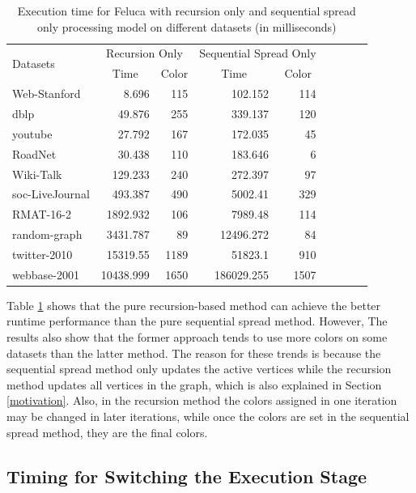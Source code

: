 \begin{table}[h]
	\centering
	\caption{Execution time for Feluca with recursion only and sequential spread only 
		processing model on different datasets (in milliseconds)}
	\label{tab:exectime}
	\begin{tabular}{|l|r|r|r|r|r|r|r|r|}
		\hline
		\multirow{2}{*}{Datasets} &\multicolumn{2}{|c|}{Recursion Only}	&\multicolumn{2}{c|}{Sequential Spread Only}\\ \cline{2-5} 
		&\multicolumn{1}{|c|}{Time}		&\multicolumn{1}{|c|}{Color}  &\multicolumn{1}{|c|}{Time}	&\multicolumn{1}{|c|}{Color} \\ \hline
		Web-Stanford		&8.696		&115			&102.152		&114\\
		dblp						&49.876		&255			&339.137		&120\\
		youtube					&27.792		&167			&172.035		&45\\
		RoadNet					&30.438		&110			&183.646		&6\\
		Wiki-Talk				&129.233	&240			&272.397		&97\\
		soc-LiveJournal	&493.387	&490			&5002.41		&329\\
		RMAT-16-2				&1892.932	&106			&7989.48		&114\\
		random-graph 		&3431.787	&89				&12496.272	&84\\
		twitter-2010		&15319.55	&1189			&51823.1		&910\\
		webbase-2001		&10438.999	&1650			&186029.255	&1507\\\hline
	\end{tabular}
\end{table}

Table \ref{tab:exectime} shows that the pure recursion-based method can achieve the better runtime performance than the pure sequential spread method. However, The results also show that the former approach tends to use more colors on some datasets than the latter method. The reason for these trends is because the sequential spread method only updates the active vertices while the recursion method updates all vertices in the graph, which is also explained in Section \ref{motivation}. Also, in the recursion method the colors assigned in one iteration may be changed in later iterations, while once the colors are set in the sequential spread method, they are the final colors. 


\subsection{Timing for Switching the Execution Stage}

